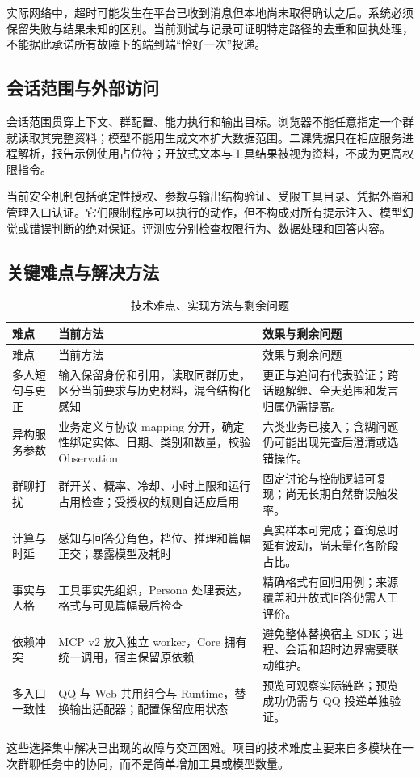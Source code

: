 实际网络中，超时可能发生在平台已收到消息但本地尚未取得确认之后。系统必须保留失败与结果未知的区别。当前测试与记录可证明特定路径的去重和回执处理，不能据此承诺所有故障下的端到端“恰好一次”投递。

\subsection{会话范围与外部访问}
会话范围贯穿上下文、群配置、能力执行和输出目标。浏览器不能任意指定一个群就读取其完整资料；模型不能用生成文本扩大数据范围。二课凭据只在相应服务进程解析，报告示例使用占位符；开放式文本与工具结果被视为资料，不成为更高权限指令。

当前安全机制包括确定性授权、参数与输出结构验证、受限工具目录、凭据外置和管理入口认证。它们限制程序可以执行的动作，但不构成对所有提示注入、模型幻觉或错误判断的绝对保证。评测应分别检查权限行为、数据处理和回答内容。

\subsection{关键难点与解决方法}
\begin{longtable}{@{}L{26mm}L{63mm}L{60mm}@{}}
\caption{技术难点、实现方法与剩余问题}\\\toprule
难点 & 当前方法 & 效果与剩余问题\\\midrule\endfirsthead
\toprule 难点 & 当前方法 & 效果与剩余问题\\\midrule\endhead
多人短句与更正 & 输入保留身份和引用，读取同群历史，区分当前要求与历史材料，混合结构化感知 & 更正与追问有代表验证；跨话题解缠、全天范围和发言归属仍需提高。\\
异构服务参数 & 业务定义与协议 mapping 分开，确定性绑定实体、日期、类别和数量，校验 Observation & 六类业务已接入；含糊问题仍可能出现先查后澄清或选错操作。\\
群聊打扰 & 群开关、概率、冷却、小时上限和运行占用检查；受授权的规则自适应启用 & 固定讨论与控制逻辑可复现；尚无长期自然群误触发率。\\
计算与时延 & 感知与回答分角色，档位、推理和篇幅正交；暴露模型及耗时 & 真实样本可完成；查询总时延有波动，尚未量化各阶段占比。\\
事实与人格 & 工具事实先组织，Persona 处理表达，格式与可见篇幅最后检查 & 精确格式有回归用例；来源覆盖和开放式回答仍需人工评价。\\
依赖冲突 & MCP v2 放入独立 worker，Core 拥有统一调用，宿主保留原依赖 & 避免整体替换宿主 SDK；进程、会话和超时边界需要联动维护。\\
多入口一致性 & QQ 与 Web 共用组合与 Runtime，替换输出适配器；配置保留应用状态 & 预览可观察实际链路；预览成功仍需与 QQ 投递单独验证。\\\bottomrule
\end{longtable}

这些选择集中解决已出现的故障与交互困难。项目的技术难度主要来自多模块在一次群聊任务中的协同，而不是简单增加工具或模型数量。
